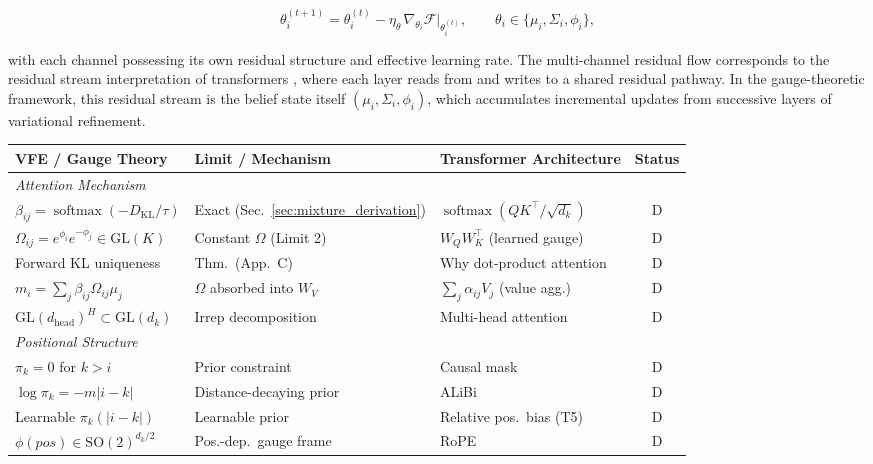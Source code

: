 \documentclass[twoside,11pt]{article}
\newcommand{\softmax}{\operatorname{softmax}}
\newcommand{\KL}{\operatorname{KL}}
\begin{document}
\begin{equation}
\theta_i^{(t+1)} = \theta_i^{(t)} - \eta_\theta \,\nabla_{\theta_i}\mathcal{F}\bigg|_{\theta_i^{(t)}}, \qquad \theta_i \in \{\mu_i, \Sigma_i, \phi_i\},
\end{equation}

with each channel possessing its own residual structure and effective learning rate. The multi-channel residual flow corresponds to the residual stream interpretation of transformers \citep{elhage2021mathematical}, where each layer reads from and writes to a shared residual pathway. In the gauge-theoretic framework, this residual stream is the belief state itself $(\mu_i, \Sigma_i, \phi_i)$, which accumulates incremental updates from successive layers of variational refinement.


\begin{table}[p]
\centering
\renewcommand{\arraystretch}{1.15}
\setlength{\tabcolsep}{4pt}
\small
\begin{tabular}{|l|l|l|c|}
\hline
\textbf{VFE / Gauge Theory} & \textbf{Limit / Mechanism} & \textbf{Transformer Architecture} & \textbf{Status} \\
\hline
\multicolumn{4}{|l|}{\textit{Attention Mechanism}} \\
\hline
$\beta_{ij} \!=\! \softmax(-D_{\KL}/\tau)$ & Exact (Sec.~\ref{sec:mixture_derivation}) & $\softmax(QK^\top\!/\!\sqrt{d_k})$ & D \\
$\Omega_{ij}\!=\!e^{\phi_i}e^{-\phi_j}\!\in\!\mathrm{GL}(K)$ & Constant $\Omega$ (Limit 2) & $W_Q W_K^\top$ (learned gauge) & D \\
Forward KL uniqueness & Thm.\ (App.~C) & Why dot-product attention & D \\
$m_i \!=\! \sum_j \beta_{ij}\Omega_{ij}\mu_j$ & $\Omega$ absorbed into $W_V$ & $\sum_j \alpha_{ij} V_j$ (value agg.) & D \\
$\mathrm{GL}(d_{\text{head}})^H \!\subset\! \mathrm{GL}(d_k)$ & Irrep decomposition & Multi-head attention & D \\
\hline
\multicolumn{4}{|l|}{\textit{Positional Structure}} \\
\hline
$\pi_k = 0$ for $k > i$ & Prior constraint & Causal mask & D \\
$\log\pi_k = -m|i\!-\!k|$ & Distance-decaying prior & ALiBi & D \\
Learnable $\pi_k(|i\!-\!k|)$ & Learnable prior & Relative pos.\ bias (T5) & D \\
$\phi(pos) \!\in\! \mathrm{SO}(2)^{d_k/2}$ & Pos.-dep.\ gauge frame & RoPE & D \\

\end{tabular}
\end{table}
\end{document}
